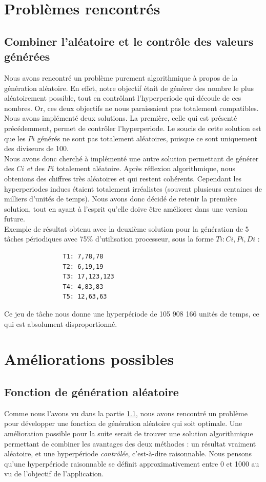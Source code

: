 	\section{Problèmes rencontrés}
		\subsection{Combiner l'aléatoire et le contrôle des valeurs générées}
			\label{sec:pb_aleatoire}
			Nous avons rencontré un problème purement algorithmique à propos de la génération aléatoire. En effet, notre objectif était de générer des nombre le plus aléatoirement possible, tout en contrôlant l'hyperperiode qui découle de ces nombres. Or, ces deux objectifs ne nous paraissaient pas totalement compatibles.\\
		
			Nous avons implémenté deux solutions. La première, celle qui est présenté précédemment, permet de contrôler l'hyperperiode. Le soucis de cette solution est que les $Pi$ générés ne sont pas totalement aléatoires, puisque ce sont uniquement des diviseurs de 100.\\
		
			Nous avons donc cherché à implémenté une autre solution permettant de générer des $Ci$ \emph{et} des $Pi$ totalement aléatoire. Après réflexion algorithmique, nous obtenions des chiffres très aléatoires et qui restent cohérents. Cependant les hyperperiodes indues étaient totalement irréalistes (souvent plusieurs centaines de milliers d'unités de temps). Nous avons donc décidé de retenir la première solution, tout en ayant à l'esprit qu'elle doive être améliorer dans une version future.\\
			
			Exemple de résultat obtenu avec la deuxième solution pour la génération de 5 tâches périodiques avec 75\% d'utilisation processeur, sous la forme $Ti: Ci,Pi,Di$ :
			\begin{lstlisting}
				T1: 7,78,78
				T2: 6,19,19
				T3: 17,123,123
				T4: 4,83,83
				T5: 12,63,63
			\end{lstlisting}
			Ce jeu de tâche nous donne une hyperpériode de 105 908 166 unités de temps, ce qui est absolument disproportionné.
	
	\section{Améliorations possibles}
		\subsection{Fonction de génération aléatoire}
			Comme nous l'avons vu dans la partie \ref{sec:pb_aleatoire}, nous avons rencontré un problème pour développer une fonction de génération aléatoire qui soit optimale. Une amélioration possible pour la suite serait de trouver une solution algorithmique permettant de combiner les avantages des deux méthodes : un résultat vraiment aléatoire, et une hyperpériode \emph{contrôlée}, c'est-à-dire raisonnable. Nous pensons qu'une hyperpériode raisonnable se définit approximativement entre 0 et 1000 au vu de l'objectif de l'application.
			
